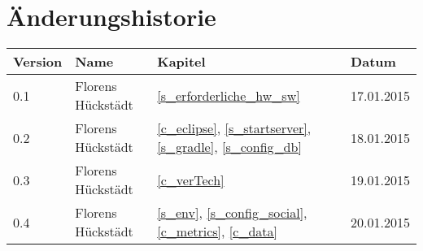 %
%

\noindent
\chapter*{Änderungshistorie}
\begin{tabularx}{\textwidth}{|l|X|l|l|} \hline
       \textbf{Version}  	& \textbf{Name}   	& \textbf{Kapitel}  						& \textbf{Datum}\\ \hline
       0.1           		& Florens Hückstädt & \ref{s_erforderliche_hw_sw} 				& 17.01.2015\\\hline
       0.2           		& Florens Hückstädt & \ref{c_eclipse}, \ref{s_startserver}, \ref{s_gradle}, \ref{s_config_db} 		& 18.01.2015\\\hline
       0.3           		& Florens Hückstädt & \ref{c_verTech} 				& 19.01.2015\\\hline
       0.4           		& Florens Hückstädt & \ref{s_env}, \ref{s_config_social}, \ref{c_metrics}, \ref{c_data} 				& 20.01.2015\\
        \hline
\end{tabularx}

